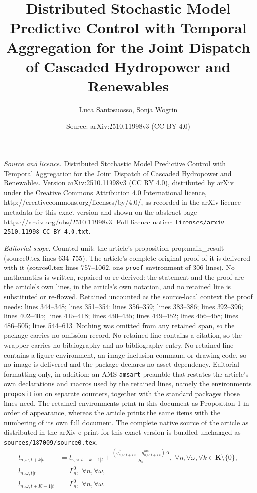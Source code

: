 \documentclass[10pt,a4paper]{amsart}
\title{Distributed Stochastic Model Predictive Control with Temporal Aggregation for the Joint Dispatch of Cascaded Hydropower and Renewables}
\author{Luca Santosuosso, Sonja Wogrin}
\date{Source: arXiv:2510.11998v3 (CC BY 4.0)}
\begin{document}
\maketitle

\noindent\emph{Source and licence.} Distributed Stochastic Model Predictive Control with Temporal Aggregation for the Joint Dispatch of Cascaded Hydropower and Renewables. Version arXiv:2510.11998v3 (CC BY 4.0), distributed by arXiv under the Creative Commons Attribution 4.0 International licence, http://creativecommons.org/licenses/by/4.0/, as recorded in the arXiv licence metadata for this exact version and shown on the abstract page https://arxiv.org/abs/2510.11998v3. Full licence notice: \texttt{licenses/arxiv-2510.11998-CC-BY-4.0.txt}.\par\smallskip

\noindent\textit{Editorial scope.} Counted unit: the article's proposition prop:main\_result (source0.tex lines 634--755). The article's complete original proof of it is delivered with it (source0.tex lines 757--1062, one \texttt{proof} environment of 306 lines). No mathematics is written, repaired or re-derived: the statement and the proof are the article's own lines, in the article's own notation, and no retained line is substituted or re-flowed.  Retained uncounted as the source-local context the proof needs: lines 344--348; lines 351--354; lines 356--359; lines 383--386; lines 392--396; lines 402--405; lines 415--418; lines 430--435; lines 449--452; lines 456--458; lines 486--505; lines 544--613.  Nothing was omitted from any retained span, so the package carries no omission record.  No retained line contains a citation, so the wrapper carries no bibliography and no bibliography entry.  No retained line contains a figure environment, an image-inclusion command or drawing code, so no image is delivered and the package declares no asset dependency.  Editorial formatting only, in addition: an AMS \texttt{amsart} preamble that restates the article's own declarations and macros used by the retained lines, namely the environments \texttt{proposition} on separate counters, together with the standard packages those lines need.  The retained environments print in this document as Proposition 1 in order of appearance, whereas the article prints the same items with the numbering of its own full document.  The complete native source of the article as distributed in the arXiv e-print for this exact version is bundled unchanged as \texttt{sources/187009/source0.tex}.
\begin{align}
l_{n, \omega, t+k | t} & = l_{n, \omega, t+k-1 | t} + \frac{\left(q^{\mathrm{in}}_{n, \omega, t+k | t} - q^{\mathrm{out}}_{n, \omega, t+k | t}\right) \Delta}{S_n}, \; \forall n, \forall \omega, \forall k \in \boldsymbol{K} \setminus \{0\}, \label{eq:cen_sto_water_level}\\
l_{n, \omega, t | t} & = L^0_{n}, \; \forall n, \forall \omega, \label{eq:cen_sto_water_level_init}\\
l_{n, \omega, t + K-1 | t} & = L^0_{n}, \; \forall n, \forall \omega. \label{eq:cen_sto_water_level_final}
\end{align}
\end{document}
